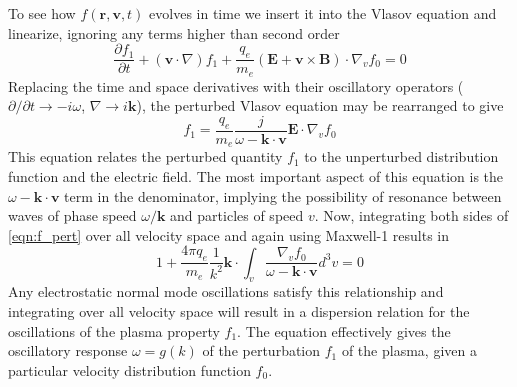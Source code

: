 To see how $f(\mathbf{r}, \mathbf{v}, t)$ evolves in time we insert it into the Vlasov equation and linearize, ignoring any terms higher than second order
\begin{equation}
\frac{\partial f_1}{\partial t} + (\mathbf{v}\cdot \nabla)f_1 +\frac{q_e}{m_e}(\mathbf{E} + \mathbf{v}\times \mathbf{B})\cdot\nabla_vf_0=0
\end{equation}
Replacing the time and space derivatives with their oscillatory operators ($\partial/\partial t \rightarrow -i\omega$, $\nabla \rightarrow i\mathbf{k}$), the perturbed Vlasov equation may be rearranged to give
\begin{equation}
f_1=\frac{q_e}{m_e}\frac{j}{\omega-\mathbf{k\cdot v}}\mathbf{E}\cdot\nabla_vf_0
\label{eqn:f_pert}
\end{equation}
This equation relates the perturbed quantity $f_1$ to the unperturbed distribution function and the electric field. The most important aspect of this equation is the $\omega-\mathbf{k\cdot v}$ term in the denominator, implying the possibility of resonance between waves of phase speed $\omega/\mathbf{k}$ and particles of speed $v$. Now, integrating both sides of \ref{eqn:f_pert} over all velocity space and again using Maxwell-1 results in
\begin{equation}
1+\frac{4\pi q_e}{m_e}\frac{1}{k^2}\mathbf{k}\cdot\int_v\frac{\nabla_v f_0}{\omega-\mathbf{k\cdot v}}d^3v=0
\label{eqn:dispersion}
\end{equation}
Any electrostatic normal mode oscillations satisfy this relationship and integrating over all velocity space will result in a dispersion relation for the oscillations of the plasma property $f_1$. The equation effectively gives the oscillatory response $\omega = g(k)$ of the perturbation $f_1$ of the plasma, given a particular velocity distribution function $f_0$. 



